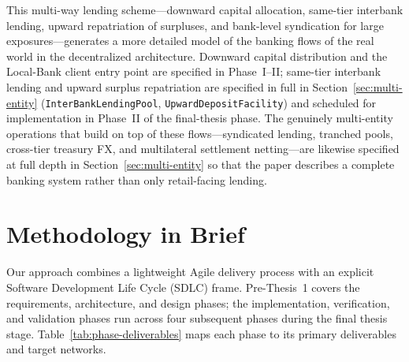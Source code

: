 \documentclass[12pt,a4paper]{report}
\begin{document}
This multi-way lending scheme---downward capital allocation, same-tier interbank lending, upward repatriation of surpluses, and bank-level syndication for large exposures---generates a more detailed model of the banking flows of the real world in the decentralized architecture. Downward capital distribution and the Local-Bank client entry point are specified in Phase~I--II; same-tier interbank lending and upward surplus repatriation are specified in full in Section~\ref{sec:multi-entity} (\texttt{InterBankLendingPool}, \texttt{UpwardDepositFacility}) and scheduled for implementation in Phase~II of the final-thesis phase. The genuinely multi-entity operations that build on top of these flows---syndicated lending, tranched pools, cross-tier treasury FX, and multilateral settlement netting---are likewise specified at full depth in Section~\ref{sec:multi-entity} so that the paper describes a complete banking system rather than only retail-facing lending.

\section{Methodology in Brief}
\label{sec:methodology-brief}

Our approach combines a lightweight Agile delivery process with an explicit Software Development Life Cycle (SDLC) frame.
Pre-Thesis~1 covers the requirements, architecture, and design phases;
the implementation, verification, and validation phases run across four
subsequent phases during the final thesis stage.
Table~\ref{tab:phase-deliverables} maps each phase to its primary
deliverables and target networks.
\end{document}
